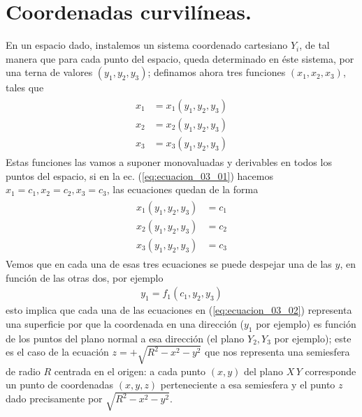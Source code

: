\section{Coordenadas curvilíneas.}
En un espacio dado, instalemos un sistema coordenado cartesiano $Y_{i}$, de tal manera que para cada punto del espacio, queda determinado en éste sistema, por una terna de valores $(y_{1}, y_{2}, y_{3})$; definamos ahora tres funciones $(x_{1}, x_{2}, x_{3})$, tales que
\begin{align}
\begin{aligned}
x_{1} &= x_{1} (y_{1}, y_{2}, y_{3}) \\
x_{2} &= x_{2} (y_{1}, y_{2}, y_{3}) \\
x_{3} &= x_{3} (y_{1}, y_{2}, y_{3})
\end{aligned}
\label{eq:ecuacion_03_01}
\end{align}
Estas funciones las vamos a suponer monovaluadas y derivables en todos los puntos del espacio, si en la ec. (\ref{eq:ecuacion_03_01}) hacemos $x_{1} = c_{1}, x_{2} = c_{2}, x_{3} =c_{3}$, las ecuaciones quedan de la forma
\begin{align}
\begin{aligned}
x_{1} (y_{1}, y_{2}, y_{3}) &= c_{1} \\
x_{2} (y_{1}, y_{2}, y_{3}) &= c_{2} \\
x_{3} (y_{1}, y_{2}, y_{3}) &= c_{3}
\end{aligned}
\label{eq:ecuacion_03_02}
\end{align}
Vemos que en cada una de esas tres ecuaciones se puede despejar una de las $y$, en función de las otras dos, por ejemplo
\begin{align*}
y_{1} = f_{1} (c_{1}, y_{2}, y_{3})
\end{align*}
esto implica que cada una de las ecuaciones en (\ref{eq:ecuacion_03_02}) representa una superficie por que la coordenada en una dirección ($y_{1}$ por ejemplo) es función de los puntos del plano normal a esa dirección (el plano $Y_{2}, Y_{3}$ por ejemplo); este es el caso de la ecuación $z = +\sqrt{R^{2} - x^{2} - y^{2}}$ que nos representa una semiesfera de radio $R$ centrada en el origen: a cada punto $(x, y)$ del plano $X \, Y$ corresponde un punto de coordenadas $(x, y , z)$ perteneciente a esa semiesfera y el punto $z$ dado precisamente por $\sqrt{R^{2} - x^{2} - y^{2}}$.

